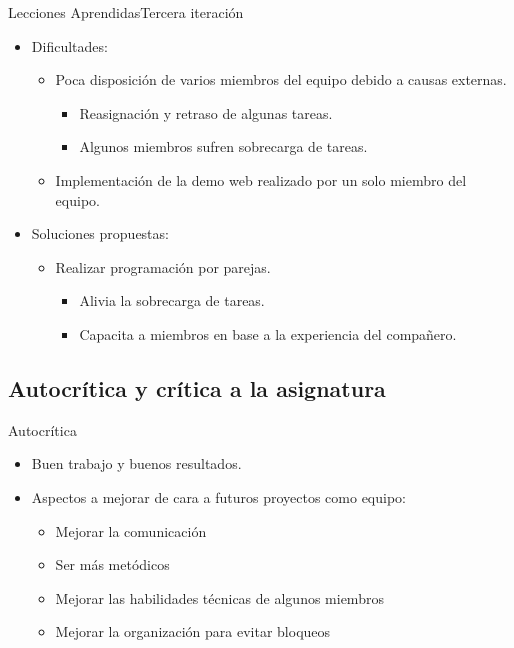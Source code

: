 \documentclass{beamer}
\begin{document}
	\begin{frame}{Lecciones Aprendidas}{Tercera iteraci\'on}
		\begin{itemize}
			\item {
				Dificultades:
				\begin{itemize}
					\item {
						Poca disposici\'on de varios miembros del equipo debido a causas externas.
						\begin{itemize}
							\item {
								Reasignaci\'on  y retraso de algunas tareas.
							}
							\item {
								Algunos miembros sufren sobrecarga de tareas.
							}
						\end{itemize}
					}
					\item {
						Implementaci\'on de la demo web realizado por un solo miembro del equipo.
					}
				\end{itemize}
			}
			\item {
				\vspace{0.5cm}
				Soluciones propuestas:
				\begin{itemize}
					\item {
						Realizar programaci\'on por parejas.
						\begin{itemize}
							\item {
								Alivia la sobrecarga de tareas.
							}
							\item {
								Capacita a miembros en base a la experiencia del compa\~nero.
							}
						\end{itemize}
					}
				\end{itemize}
			}
		\end{itemize}
	
	  
	\end{frame}

\subsection{Autocr\'itica y cr\'itica a la asignatura}

\begin{frame}{Autocr\'itica}
  \begin{itemize}
  \item { Buen trabajo y buenos resultados. }
  \item { Aspectos a mejorar de cara a futuros proyectos como equipo:
    \begin{itemize}
    \item {Mejorar la comunicaci\'on}
    \item {Ser m\'as met\'odicos}
    \item {Mejorar las habilidades t\'ecnicas de algunos miembros}
    \item {Mejorar la organizaci\'on para evitar bloqueos}
    \end{itemize}
  }
  \end{itemize}
\end{frame}
\end{document}
